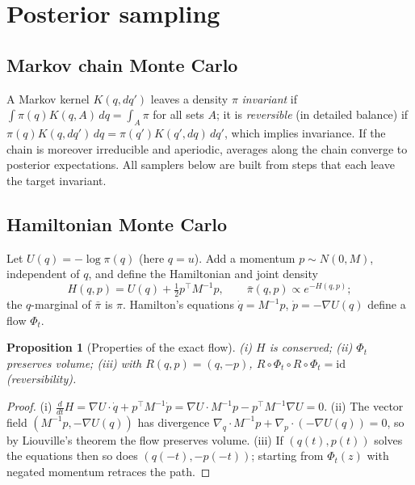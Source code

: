 \documentclass[11pt]{article}
\newtheorem{proposition}[theorem]{Proposition}
\theoremstyle{definition}
\theoremstyle{remark}
\begin{document}
\section{Posterior sampling}\label{sec:mcmc}
\subsection{Markov chain Monte Carlo}
A Markov kernel $K(q,dq')$ leaves a density $\pi$ \emph{invariant} if $\int\pi(q)K(q,A)\,dq=\int_A\pi$ for all sets $A$; it is \emph{reversible} (in detailed balance) if $\pi(q)K(q,dq')\,dq=\pi(q')K(q',dq)\,dq'$, which implies invariance. If the chain is moreover irreducible and aperiodic, averages along the chain converge to posterior expectations. All samplers below are built from steps that each leave the target invariant.

\subsection{Hamiltonian Monte Carlo}
Let $U(q)=-\log\pi(q)$ (here $q=u$). Add a momentum $p\sim N(0,M)$, independent of $q$, and define the Hamiltonian and joint density
\[
H(q,p)=U(q)+\tfrac12p^\top M^{-1}p,\qquad\bar\pi(q,p)\propto e^{-H(q,p)} ;
\]
the $q$-marginal of $\bar\pi$ is $\pi$. Hamilton's equations $\dot q=M^{-1}p$, $\dot p=-\nabla U(q)$ define a flow $\Phi_t$.
\begin{proposition}[Properties of the exact flow]\label{prop:flow}
(i) $H$ is conserved; (ii) $\Phi_t$ preserves volume; (iii) with $R(q,p)=(q,-p)$, $R\circ\Phi_t\circ R\circ\Phi_t=\mathrm{id}$ (reversibility).
\end{proposition}
\begin{proof}
(i) $\frac{d}{dt}H=\nabla U\cdot\dot q+p^\top M^{-1}\dot p=\nabla U\cdot M^{-1}p-p^\top M^{-1}\nabla U=0$. (ii) The vector field $(M^{-1}p,-\nabla U(q))$ has divergence $\nabla_q\cdot M^{-1}p+\nabla_p\cdot(-\nabla U(q))=0$, so by Liouville's theorem the flow preserves volume. (iii) If $(q(t),p(t))$ solves the equations then so does $(q(-t),-p(-t))$; starting from $\Phi_t(z)$ with negated momentum retraces the path.
\end{proof}
\end{document}
